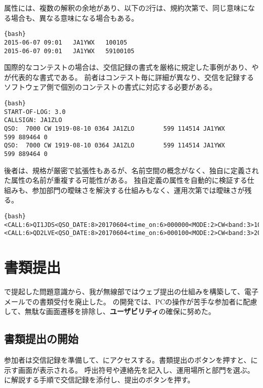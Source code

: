 \documentclass[10pt,a4paper]{book}
\begin{document}
属性には、複数の解釈の余地があり、以下の2行は、規約次第で、同じ意味になる場合も、異なる意味になる場合もある。

\begin{Verbatim}{bash}
2015-06-07 09:01   JA1YWX   100105
2015-06-07 09:01   JA1YWX   59100105
\end{Verbatim}

国際的なコンテストの場合は、交信記録の書式を厳格に規定した事例があり、\cbr{}や\adi{}が代表的な書式である。
前者はコンテスト毎に詳細が異なり、交信を記録するソフトウェア側で個別のコンテストの書式に対応する必要がある。

\begin{Verbatim}{bash}
START-OF-LOG: 3.0
CALLSIGN: JA1ZLO
QSO:  7000 CW 1919-08-10 0364 JA1ZLO        599 114514 JA1YWX        599 889464 0
QSO:  7000 CW 1919-08-10 0364 JA1ZLO        599 114514 JA1YWX        599 889464 0
\end{Verbatim}

後者は、規格が厳密で拡張性もあるが、名前空間の概念がなく、独自に定義された属性の名前が重複する可能性がある。
独自定義の属性を自動的に検証する仕組みも、参加部門の曖昧さを解決する仕組みもなく、運用次第では曖昧さが残る。

\begin{Verbatim}{bash}
<CALL:6>QI1JDS<QSO_DATE:8>20170604<time_on:6>000000<MODE:2>CW<band:3>10m<RST_RCVD:3>599<SRX:4>1005<eor>
<CALL:6>QD2LVE<QSO_DATE:8>20170604<time_on:6>000100<MODE:2>CW<band:3>20m<RST_RCVD:3>599<SRX:4>1336<eor>
\end{Verbatim}

\chapter{書類提出}

で提起した問題意識から、我が無線部ではウェブ提出の仕組みを構築して、電子メールでの書類受付を廃止した。
の開発では、PCの操作が苦手な参加者に配慮して、無駄な画面遷移を排除し、\textbf{ユーザビリティ}の確保に努めた。

\section{書類提出の開始\label{sect:entry}}

参加者は交信記録を準備して、にアクセスする。書類提出のボタンを押すと、に示す画面が表示される。
呼出符号や連絡先を記入し、運用場所と部門を選ぶ。に解説する手順で交信記録を添付し、提出のボタンを押す。
\end{document}
